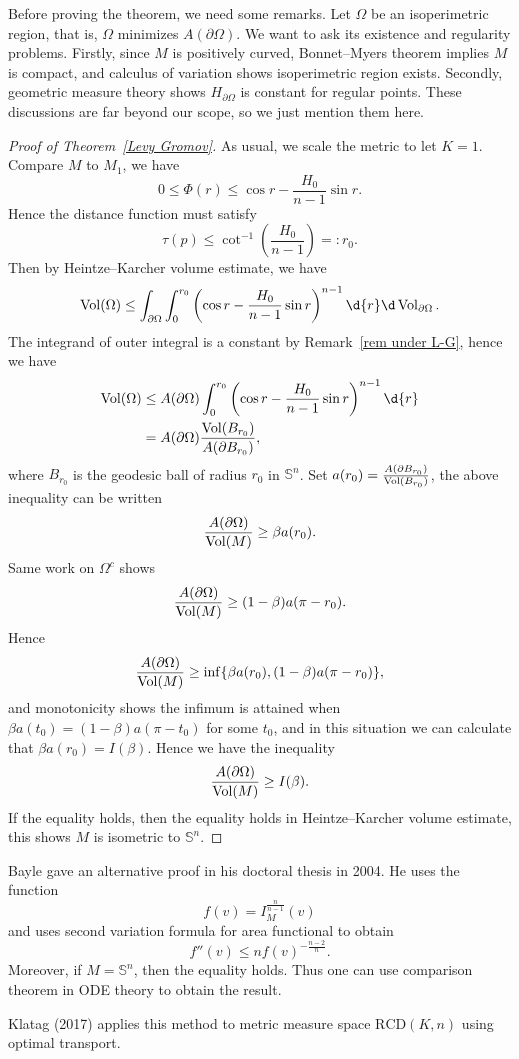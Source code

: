 \begin{rem}\label{rem under L-G}
    Before proving the theorem, we need some remarks.
    Let $\Omega$ be an isoperimetric region, that is, $\Omega$ minimizes $A(\partial\Omega)$.
    We want to ask its existence and regularity problems.
    Firstly, since $M$ is positively curved, Bonnet--Myers theorem implies $M$ is compact, and calculus of variation shows isoperimetric region exists.
    Secondly, geometric measure theory shows $H_{\partial\Omega}$ is constant for regular points.
    These discussions are far beyond our scope, so we just mention them here.
\end{rem}

\begin{proof}[Proof of Theorem~\ref{Levy Gromov}]
    As usual, we scale the metric to let $K=1$.
    Compare $M$ to $M_1$, we have
    \[0\leq\Phi(r)\leq\cos{r}-\frac{H_0}{n-1}\sin{r}.\]
    Hence the distance function must satisfy
    \[\tau(p)\leq\cot^{-1}\left(\frac{H_0}{n-1}\right)=:r_0.\]
    Then by Heintze--Karcher volume estimate, we have
    \[\Vol(\Omega)\leq\int_{\partial\Omega}\int_0^{r_0}\left(\cos{r}-\frac{H_0}{n-1}\sin{r}\right)^{n-1}\d{r}\d\Vol_{\partial\Omega}.\]
    The integrand of outer integral is a constant by Remark~\ref{rem under L-G}, hence we have
    \begin{align*}
        \Vol(\Omega)&\leq A(\partial\Omega)\int_{0}^{r_0}\left(\cos{r}-\frac{H_0}{n-1}\sin{r}\right)^{n-1}\d{r}\\
        &=A(\partial\Omega)\frac{\Vol(B_{r_0})}{A(\partial B_{r_0})},
    \end{align*}
    where $B_{r_0}$ is the geodesic ball of radius $r_0$ in $\mathbb{S}^n$.
    Set $a(r_0)=\frac{A(\partial B_{r_0})}{\operatorname{Vol}(B_{r_0})}$, the above inequality can be written
    \[\frac{A(\partial\Omega)}{\operatorname{Vol}(M)}\geq\beta a(r_0).\]
    Same work on $\Omega^c$ shows
    \[\frac{A(\partial\Omega)}{\operatorname{Vol}(M)}\geq(1-\beta)a(\pi-r_0).\]
    Hence
    \[\frac{A(\partial\Omega)}{\operatorname{Vol}(M)}\geq\inf\{\beta a(r_0),(1-\beta)a(\pi-r_0)\},\]
    and monotonicity shows the infimum is attained when $\beta a(t_0)=(1-\beta)a(\pi-t_0)$ for some $t_0$, and in this situation we can calculate that $\beta a(r_0)=I(\beta)$.
    Hence we have the inequality
    \[\frac{A(\partial\Omega)}{\operatorname{Vol}(M)}\geq I(\beta).\]
    If the equality holds, then the equality holds in Heintze--Karcher volume estimate, this shows $M$ is isometric to $\mathbb{S}^n$.
\end{proof}

\begin{rem}
    Bayle gave an alternative proof in his doctoral thesis in 2004.
    He uses the function
    \[f(v)=I^{\frac{n}{n-1}}_M(v)\]
    and uses second variation formula for area functional to obtain
    \[f''(v)\leq nf(v)^{-\frac{n-2}{n}}.\]
    Moreover, if $M=\mathbb{S}^n$, then the equality holds.
    Thus one can use comparison theorem in ODE theory to obtain the result.

    Klatag (2017) applies this method to metric measure space $\mathrm{RCD}(K,n)$ using optimal transport.
\end{rem}

